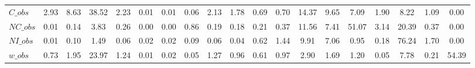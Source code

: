 \begin{center}
\begin{longtable}{lcccccccccccccccccc}
$C\_obs         $	 & 	            2.93	 & 	            8.63	 & 	           38.52	 & 	            2.23	 & 	            0.01	 & 	            0.01	 & 	            0.06	 & 	            2.13	 & 	            1.78	 & 	            0.69	 & 	            0.70	 & 	           14.37	 & 	            9.65	 & 	            7.09	 & 	            1.90	 & 	            8.22	 & 	            1.09	 & 	            0.00 \\ 
$NC\_obs        $	 & 	            0.01	 & 	            0.14	 & 	            3.83	 & 	            0.26	 & 	            0.00	 & 	            0.00	 & 	            0.86	 & 	            0.19	 & 	            0.18	 & 	            0.21	 & 	            0.37	 & 	           11.56	 & 	            7.41	 & 	           51.07	 & 	            3.14	 & 	           20.39	 & 	            0.37	 & 	            0.00 \\ 
$NI\_obs        $	 & 	            0.01	 & 	            0.10	 & 	            1.49	 & 	            0.06	 & 	            0.02	 & 	            0.02	 & 	            0.09	 & 	            0.06	 & 	            0.04	 & 	            0.62	 & 	            1.44	 & 	            9.91	 & 	            7.06	 & 	            0.95	 & 	            0.18	 & 	           76.24	 & 	            1.70	 & 	            0.00 \\ 
$w\_obs         $	 & 	            0.73	 & 	            1.95	 & 	           23.97	 & 	            1.24	 & 	            0.01	 & 	            0.02	 & 	            0.05	 & 	            1.27	 & 	            0.96	 & 	            0.61	 & 	            0.97	 & 	            2.90	 & 	            1.69	 & 	            1.20	 & 	            0.05	 & 	            7.78	 & 	            0.21	 & 	           54.39 \\ 
\end{longtable}
 \end{center}
